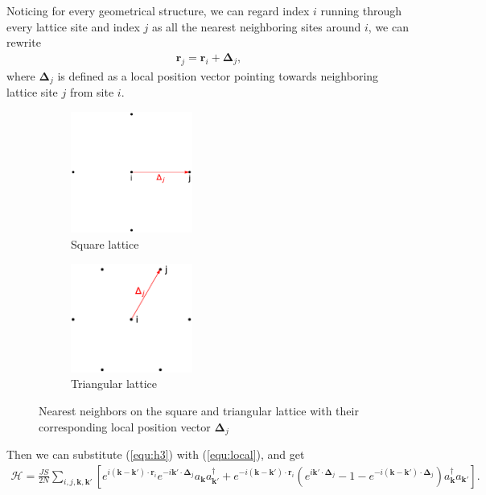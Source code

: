 \documentclass[a4paper,12pt]{article}
\begin{document}
		Noticing for every geometrical structure, we can regard index $i$ running through every lattice site and index $j$ as all the nearest neighboring sites around $i$, we can rewrite
		\begin{align}
			\mathbf{r}_j=\mathbf{r}_i+\mathbf{\Delta}_j,
			\label{equ:local}
		\end{align}
		where $\mathbf{\Delta}_j$ is defined as a local position vector pointing towards neighboring lattice site $j$ from site $i$.
		\begin{figure}[H]
			\centering
			\begin{subfigure}[b]{0.3\textwidth}
				\includegraphics[width=4cm,keepaspectratio]{sq_local}
				\caption{Square lattice}
				\label{fig:sq_local}
			\end{subfigure}
			\quad
			\begin{subfigure}[b]{0.3\textwidth}
				\includegraphics[width=4cm,keepaspectratio]{tri_local}
				\caption{Triangular lattice}
				\label{fig:tri_local}
			\end{subfigure}
			\caption{Nearest neighbors on the square and triangular lattice with their corresponding local position vector $\mathbf{\Delta}_j$}
		\end{figure}
		Then we can substitute (\ref{equ:h3}) with (\ref{equ:local}), and get 
		\begin{align}
			\mathcal{H}=\frac{JS}{2N}\sum_{i,j,\mathbf{k},\mathbf{k}'}\left[e^{i(\mathbf{k}-\mathbf{k}')\cdot\mathbf{r}_i}e^{-i\mathbf{k}'\cdot\mathbf{\Delta}_j}a_\mathbf{k}a^\dagger_{\mathbf{k}'}+e^{-i(\mathbf{k}-\mathbf{k}')\cdot\mathbf{r}_i}\left(e^{i\mathbf{k}'\cdot\mathbf{\Delta}_j}-1-e^{-i(\mathbf{k}-\mathbf{k}')\cdot\mathbf{\Delta}_j}\right)a_\mathbf{k}^\dagger a_{\mathbf{k}'}\right].
		\end{align}
\end{document}
